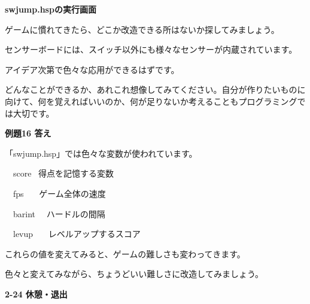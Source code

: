 \documentclass[a4paper,dvipdfmx]{jarticle}
\newcommand\textstyleqwerty[1]{#1}
\begin{document}
\bigskip


\bigskip


\bigskip


\bigskip


\bigskip


\bigskip


\bigskip


\bigskip


\bigskip


\bigskip


\bigskip


\bigskip

\textstyleqwerty{\textbf{swjump.hspの実行画面}}


\bigskip


\bigskip


\bigskip


\bigskip


\bigskip

ゲームに慣れてきたら、どこか改造できる所はないか探してみましょう。

センサーボードには、スイッチ以外にも様々なセンサーが内蔵されています。

アイデア次第で色々な応用ができるはずです。

どんなことができるか、あれこれ想像してみてください。自分が作りたいものに向けて、何を覚えればいいのか、何が足りないか考えることもプログラミングでは大切です。


\bigskip


\bigskip

{\bfseries
例題16 答え}


\bigskip

「swjump.hsp」では色々な変数が使われています。


\bigskip

\ \ score \ 得点を記憶する変数

\ \ fps \ \ \ ゲーム全体の速度

\ \ barint \ \ ハードルの間隔

\ \ levup \ \ \ レベルアップするスコア


\bigskip

これらの値を変えてみると、ゲームの難しさも変わってきます。

色々と変えてみながら、ちょうどいい難しさに改造してみましょう。


\bigskip


\bigskip


\bigskip

{\bfseries
2-24 休憩・退出}


\bigskip
\end{document}
